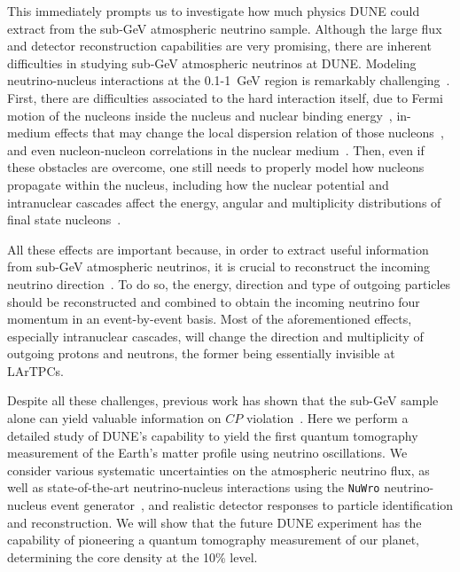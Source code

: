 This immediately prompts us to investigate how much physics DUNE could extract from the sub-GeV atmospheric neutrino sample.
Although the large flux and detector reconstruction capabilities are very promising, there are inherent difficulties in studying sub-GeV atmospheric neutrinos  at DUNE.
Modeling neutrino-nucleus interactions at the 0.1-1~GeV region is remarkably challenging~\cite{Benhar:2015wva}.
First, there are difficulties associated to the hard interaction itself, due to Fermi motion of the nucleons inside the nucleus and nuclear binding energy~\cite{Dutta:2000sn, JLabE91013:2003gdp, Benhar:1994hw, Dickhoff:2004xx, Benhar:2006wy, Ankowski:2014yfa, Benhar:2015ula, Rocco:2015cil, Barbieri:2016uib, Rocco:2018mwt, Rocco:2020jlx}, in-medium effects that may change the local dispersion relation of those nucleons~\cite{Arnold:1981dt, Hama:1990vr, Cooper:1993nx}, and even nucleon-nucleon correlations in the nuclear medium~\cite{Mathiot:1980js, Kohno:1981dg, Dehesa:1985asb, Jiang:1992wn, Sobczyk:2012ms, Megias:2014qva, Megias:2016fjk}.
Then, even if these obstacles are overcome, one still needs to properly model how nucleons propagate within the nucleus, including how the nuclear potential and intranuclear cascades affect the energy, angular and multiplicity distributions of final state nucleons~\cite{Bertini:1963zzc, Cugnon:1980zz, Bertsch:1984gb, Bertsch:1988ik, Cugnon:1996xf, Boudard:2002yn, Sawada:2012hk, Uozumi:2012fm, Golan:2012wx, Isaacson:2020wlx, Dytman:2021ohr}.

All these effects are important because, in order to extract useful information from sub-GeV atmospheric neutrinos, it is crucial to reconstruct the incoming neutrino direction~\cite{Kelly:2019itm}.
To do so, the energy, direction and type of outgoing particles should be reconstructed and combined to obtain the incoming neutrino four momentum in an event-by-event basis.
Most of the aforementioned effects, especially intranuclear cascades, will change the direction and multiplicity of outgoing protons and neutrons, the former being essentially invisible at LArTPCs.

Despite all these challenges, previous work has shown that the sub-GeV sample alone can yield valuable information on $CP$ violation~\cite{Kelly:2019itm}.
Here we perform a detailed study of DUNE's capability to yield the first quantum tomography measurement of the Earth's matter profile using neutrino oscillations.
We consider various systematic uncertainties on the atmospheric neutrino flux, as well as state-of-the-art neutrino-nucleus interactions using the \texttt{NuWro} neutrino-nucleus event generator~\cite{Golan:2012rfa}, and realistic detector responses to particle identification and reconstruction.
We will show that the future DUNE experiment has the capability of pioneering a quantum tomography measurement of our planet, determining the core density at the 10\% level.

